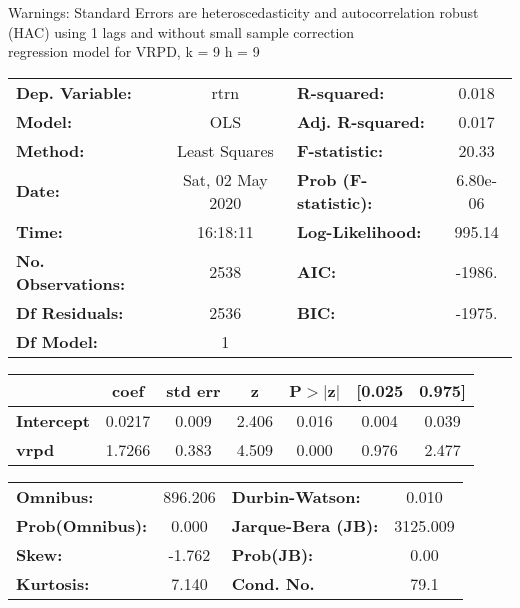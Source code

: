 Warnings: \newline
 [1] Standard Errors are heteroscedasticity and autocorrelation robust (HAC) using 1 lags and without small sample correction\\ 

regression model for VRPD, k = 9 h = 9\begin{center}
\begin{tabular}{lclc}
\toprule
\textbf{Dep. Variable:}    &       rtrn       & \textbf{  R-squared:         } &     0.018   \\
\textbf{Model:}            &       OLS        & \textbf{  Adj. R-squared:    } &     0.017   \\
\textbf{Method:}           &  Least Squares   & \textbf{  F-statistic:       } &     20.33   \\
\textbf{Date:}             & Sat, 02 May 2020 & \textbf{  Prob (F-statistic):} &  6.80e-06   \\
\textbf{Time:}             &     16:18:11     & \textbf{  Log-Likelihood:    } &    995.14   \\
\textbf{No. Observations:} &        2538      & \textbf{  AIC:               } &    -1986.   \\
\textbf{Df Residuals:}     &        2536      & \textbf{  BIC:               } &    -1975.   \\
\textbf{Df Model:}         &           1      & \textbf{                     } &             \\
\bottomrule
\end{tabular}
\begin{tabular}{lcccccc}
                   & \textbf{coef} & \textbf{std err} & \textbf{z} & \textbf{P$> |$z$|$} & \textbf{[0.025} & \textbf{0.975]}  \\
\midrule
\textbf{Intercept} &       0.0217  &        0.009     &     2.406  &         0.016        &        0.004    &        0.039     \\
\textbf{vrpd}      &       1.7266  &        0.383     &     4.509  &         0.000        &        0.976    &        2.477     \\
\bottomrule
\end{tabular}
\begin{tabular}{lclc}
\textbf{Omnibus:}       & 896.206 & \textbf{  Durbin-Watson:     } &    0.010  \\
\textbf{Prob(Omnibus):} &   0.000 & \textbf{  Jarque-Bera (JB):  } & 3125.009  \\
\textbf{Skew:}          &  -1.762 & \textbf{  Prob(JB):          } &     0.00  \\
\textbf{Kurtosis:}      &   7.140 & \textbf{  Cond. No.          } &     79.1  \\
\bottomrule
\end{tabular}
\end{center}

